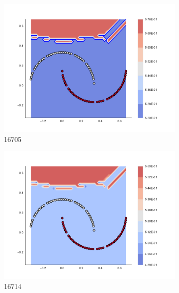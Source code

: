 \begin{figure}[h]
\begin{subfigure}[b]{0.09\textwidth}
    \includegraphics[clip, trim=2.35cm 1.75cm 4.5cm 0cm,width=\textwidth]{img/convergence/16705.pdf}
    \caption{16705}
    \label{fig:convergence_16705}
\end{subfigure}
%
\begin{subfigure}[b]{0.09\textwidth}
    \includegraphics[clip, trim=2.35cm 1.75cm 4.5cm 0cm,width=\textwidth]{img/convergence/16714.pdf}
    \caption{16714}
    \label{fig:convergence_16714}
\end{subfigure}
%
\begin{subfigure}[b]{0.09\textwidth}

\end{subfigure}
\end{figure}
